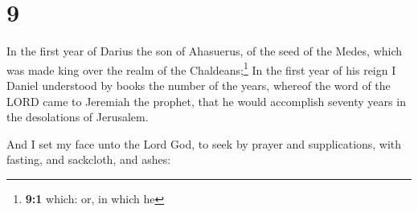 \hypertarget{section-8}{%
\section{9}\label{section-8}}

 In the first year of Darius the son of Ahasuerus, of the
seed of the Medes, which was made king over the realm of the
Chaldeans;\footnote{\textbf{9:1} which: or, in which he} 
In the first year of his reign I Daniel understood by books the number
of the years, whereof the word of the LORD came to Jeremiah the prophet,
that he would accomplish seventy years in the desolations of Jerusalem.

 And I set my face unto the Lord God, to seek by prayer
and supplications, with fasting, and sackcloth, and ashes:

